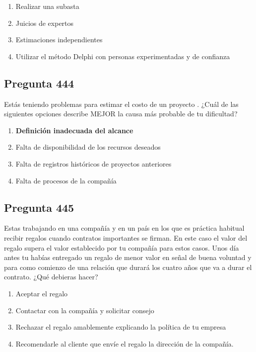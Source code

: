 \documentclass[11pt,a4paper]{article}
\begin{document}
\begin{enumerate}[label=\alph*)]
  \item Realizar una subasta
  \item Juicios de expertos
  \item Estimaciones independientes
  \item Utilizar el método Delphi con personas experimentadas y de confianza
\end{enumerate}

\subsection*{Pregunta 444}
Estás teniendo problemas para estimar el costo de un proyecto . ¿Cuál de las siguientes opciones describe MEJOR la causa más probable de tu dificultad?

\begin{enumerate}[label=\alph*)]
  \item \textbf{Definición inadecuada del alcance}
  \item Falta de disponibilidad de los recursos deseados
  \item Falta de registros históricos de proyectos anteriores
  \item Falta de procesos de la compañía
\end{enumerate}

\subsection*{Pregunta 445}
Estas trabajando en una compañía y en un país en los que es práctica habitual recibir regalos cuando contratos importantes se firman. En este caso el valor del regalo supera el valor establecido por tu compañía para estos casos. Unos día antes tu habías entregado un regalo de menor valor en señal de buena voluntad y para como comienzo de una relación que durará los cuatro años que va a durar el contrato. ¿Qué debieras hacer?

\begin{enumerate}[label=\alph*)]
  \item Aceptar el regalo
  \item Contactar con la compañía y solicitar consejo
  \item Rechazar el regalo amablemente explicando la política de tu empresa
  \item Recomendarle al cliente que envíe el regalo la dirección de la compañía.
\end{enumerate}
\end{document}
